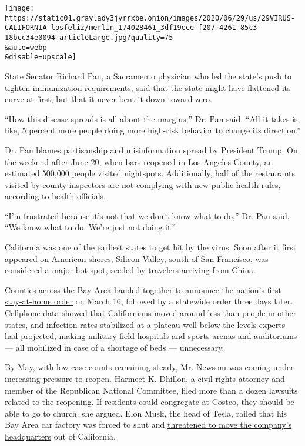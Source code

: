 \texttt{[image: https://static01.graylady3jvrrxbe.onion/images/2020/06/29/us/29VIRUS-CALIFORNIA-losfeliz/merlin\_174028461\_3df19ece-f207-4261-85c3-18bcc34e0094-articleLarge.jpg?quality=75\\\&auto=webp\\\&disable=upscale]}

State Senator Richard Pan, a Sacramento physician who led the state's
push to tighten immunization requirements, said that the state might
have flattened its curve at first, but that it never bent it down toward
zero.

``How this disease spreads is all about the margins,'' Dr. Pan said.
``All it takes is, like, 5 percent more people doing more high-risk
behavior to change its direction.''

Dr. Pan blames partisanship and misinformation spread by President
Trump. On the weekend after June 20, when bars reopened in Los Angeles
County, an estimated 500,000 people visited nightspots. Additionally,
half of the restaurants visited by county inspectors are not complying
with new public health rules, according to health officials.

``I'm frustrated because it's not that we don't know what to do,'' Dr.
Pan said. ``We know what to do. We're just not doing it.''

California was one of the earliest states to get hit by the virus. Soon
after it first appeared on American shores, Silicon Valley, south of San
Francisco, was considered a major hot spot, seeded by travelers arriving
from China.

Counties across the Bay Area banded together to announce
\href{https://www.nytimes3xbfgragh.onion/2020/03/16/us/california-covid-19.html}{the
nation's first stay-at-home order} on March 16, followed by a statewide
order three days later. Cellphone data showed that Californians moved
around less than people in other states, and infection rates stabilized
at a plateau well below the levels experts had projected, making
military field hospitals and sports arenas and auditoriums --- all
mobilized in case of a shortage of beds --- unnecessary.

By May, with low case counts remaining steady, Mr. Newsom was coming
under increasing pressure to reopen. Harmeet K. Dhillon, a civil rights
attorney and member of the Republican National Committee, filed more
than a dozen lawsuits related to the reopening. If residents could
congregate at Costco, they should be able to go to church, she argued.
Elon Musk, the head of Tesla, railed that his Bay Area car factory was
forced to shut and
\href{https://www.nytimes3xbfgragh.onion/2020/05/09/business/coronavirus-elon-musk-tesla-california.html}{threatened
to move the company's headquarters} out of California.

